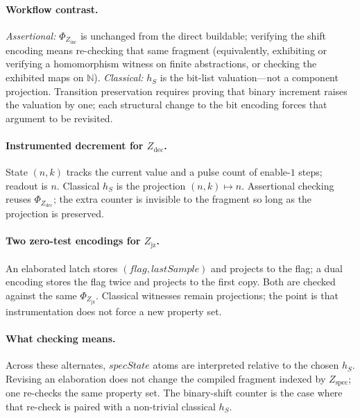 \paragraph{Workflow contrast.}
\textit{Assertional:} $\Phi_{Z_{\mathrm{inc}}}$ is unchanged from the direct buildable; verifying the shift encoding means re-checking that same fragment (equivalently, exhibiting or verifying a homomorphism witness on finite abstractions, or checking the exhibited maps on $\mathbb{N}$).
\textit{Classical:} $h_S$ is the bit-list valuation---not a component projection. Transition preservation requires proving that binary increment raises the valuation by one; each structural change to the bit encoding forces that argument to be revisited.

\paragraph{Instrumented decrement for $Z_{\mathrm{dec}}$.}
State $(n,k)$ tracks the current value and a pulse count of enable-$1$ steps; readout is $n$. Classical $h_S$ is the projection $(n,k)\mapsto n$. Assertional checking reuses $\Phi_{Z_{\mathrm{dec}}}$; the extra counter is invisible to the fragment so long as the projection is preserved.

\paragraph{Two zero-test encodings for $Z_{\mathrm{jz}}$.}
An elaborated latch stores $(\mathit{flag},\mathit{lastSample})$ and projects to the flag; a dual encoding stores the flag twice and projects to the first copy. Both are checked against the same $\Phi_{Z_{\mathrm{jz}}}$. Classical witnesses remain projections; the point is that instrumentation does not force a new property set.

\paragraph{What checking means.}
Across these alternates, $\mathit{specState}$ atoms are interpreted relative to the chosen $h_S$. Revising an elaboration does not change the compiled fragment indexed by $Z_{\text{spec}}$; one re-checks the same property set. The binary-shift counter is the case where that re-check is paired with a non-trivial classical $h_S$.
